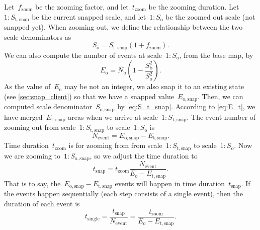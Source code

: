 \documentclass[ijgi,article,submit,moreauthors,pdftex]{Definitions/mdpi}
\begin{document}
Let~$f_\mathrm{zoom}$ be the zooming factor, and 
let~$t_\mathrm{zoom}$ be the zooming duration.
Let~$1:S_\mathrm{t,snap}$ be the current snapped scale, and 
let~$1:S_\mathrm{o}$ be the zoomed out scale (not snapped yet).
When zooming out, we define the relationship 
between the two scale denominators as
\begin{equation}
\label{eq:S_o}
S_\mathrm{o} = S_\mathrm{t,snap} (1 + f_\mathrm{zoom}).
\end{equation}
We can also compute the number of events at scale~$1:S_\mathrm{o}$, 
from the base map, by
\begin{equation*}
\label{eq:E_o}
E_\mathrm{o} = N_\mathrm{b} \left(1-\frac{S^2_\mathrm{b}}{S^2_\mathrm{o}}\right).
\end{equation*}
As the value of~$E_\mathrm{o}$ may be not an integer, 
we also snap it to an existing state
(see \sect\ref{sec:snap_client})
so that we have a snapped value~$E_\mathrm{o,snap}$.
Then, we can computed scale denominator~$S_\mathrm{o,snap}$
by \eq\ref{eq:S_t_snap}.
According to \eq\ref{eq:E_t}, we have merged~$E_\mathrm{t,snap}$ areas 
when we arrive at scale~$1:S_\mathrm{t,snap}$.
The event number of zooming out
from scale~$1:S_\mathrm{t,snap}$ to scale~$1:S_\mathrm{o}$ is
\begin{equation}
\label{eq:N_event}
N_\mathrm{event} = 
E_\mathrm{o,snap} - E_\mathrm{t,snap}.
\end{equation}
Time duration~$t_\mathrm{zoom}$ is for zooming from 
from scale~$1:S_\mathrm{t,snap}$ to scale~$1:S_\mathrm{o}$.
Now we are zooming to~$1:S_\mathrm{o,snap}$,
so we adjust the time duration to
\begin{equation*}
\label{eq:E_i}
t_\mathrm{snap}= t_\mathrm{zoom} 
\frac{N_\mathrm{event}}
{E_\mathrm{o} - E_\mathrm{t,snap}}.
\end{equation*}
That is to say, the~$E_\mathrm{o,snap} - E_\mathrm{t,snap}$ events will happen 
in time duration~$t_\mathrm{snap}$.
If the events happen sequentially (each step consists of a single event), 
then the duration of each event is
\begin{equation}
\label{eq:t_single}
t_\mathrm{single}   = \frac{t_\mathrm{snap}}{N_\mathrm{event}} 
                    = \frac{t_\mathrm{zoom}}{E_\mathrm{o} - E_\mathrm{t,snap}}.
\end{equation}
\end{document}

